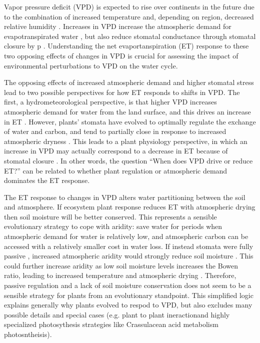 Vapor pressure deficit (VPD) is expected to rise over continents in
the future due to the combination of increased temperature and,
depending on region, decreased relative humidity
\citep{Byrne_2013}. Increases in VPD increase the atmospheric demand
for evapotranspirated water \citep{Penman_1948, Monteith_1965}, but
also reduce stomatal conductance through stomatal closure \citep{Leuning_1990, MEDLYN_2011} by
p \citep{Rawson1977, Mott2007,
Darmour2010}. Understanding the net evaportanspiration (ET) response
to these two opposing effects of changes in VPD is crucial for
assessing the impact of environmental perturbations to VPD on the
water cycle.

The opposing effects of increased atmospheric demand and higher
stomatal stress lead to two possible perspectives for how ET responds
to shifts in VPD. The first, a hydrometeorological perspective, is
that higher VPD increases atmospheric demand for water from the land
surface, and this drives an increase in ET
\citep{Penman_1948}. However, plants' stomata have evolved to
optimally regulate the exchange of water and carbon, and tend to
partially close in response to increased atmospheric dryness
\citep{Farquhar_1978, Ball_1987, Leuning_1990, Katul_2009, MEDLYN_2011}. This
leads to a plant physiology perspective, in which an increase in VPD
may actually correspond to a decrease in ET because of stomatal
closure \citep[e.g.][]{Rigden_2017}.  In other words, the question
``When does VPD drive or reduce ET?'' can be related to whether plant
regulation or atmospheric demand dominates the ET response.

The ET response to changes in VPD alters water partitioning between
the soil and atmosphere. If ecosystem plant response reduces ET with
atmospheric drying then soil moisture will be better conserved. This
represents a sensible evolutionary strategy to cope with aridity: save
water for periods when atmospheric demand for water is relatively low,
and atmospheric carbon can be accessed with a relatively smaller cost
in water loss. If instead stomata were fully passive \citep [similar
to soil pores, e.g. ][]{Or_2013}, increased atmospheric aridity would
strongly reduce soil moisture \citep{Berg_2017}. This could further
increase aridity as low soil moisture levels increases the Bowen
ratio, leading to increased temperature and atmospheric drying
\citep[][]{Bouchet_1963, Morton_1965, Brutsaert_1999, Ozdogan_2006,
Salvucci_2013, Gentine_2016, Berg_2016, Zhou_2019}. Therefore, passive
regulation and a lack of soil moisture conservation does not seem to
be a sensible strategy for plants from an evolutionary
standpoint. This simplified logic explains generally why plants
evolved to respod to VPD, but also excludes many possible details and
special cases (e.g. plant to plant ineractionand highly specialized
photosythesis strategies like Crassulacean acid metabolism
photosntheisis).

